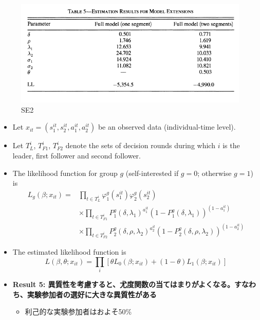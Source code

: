 \documentclass[../root]{subfiles}
\begin{document}
    \begin{figure}
    \centering
    \includegraphics[width = 0.8\linewidth]{1009kato/95461603-61d2d300-09b1-11eb-8ad4-a617d0c1fb57.png}
    \caption{SE2}
    \end{figure}

    \begin{itemize}
    \item
      Let \(x_{it} = (s_1^{it}, s_2^{it}, a_1^{it}, a_2^{it})\) be an observed data (individual-time level).
    \item
      Let \(T^i_L\), \(T^i_{F1}\), \(T^i_{F2}\) denote the sets of decision rounds during which \(i\) is the leader, first follower and second follower.
    \item
      The likelihood function for group \(g\) (self-interested if \(g = 0\); otherwise \(g = 1\)) is
      \begin{equation}
        \begin{split}
          L_g(\beta;x_{it}) =
          &\prod_{t \in T^i_L} \varphi^g_1(s_1^{it}) \varphi^g_2(s_2^{it}) \\
          &\times \prod_{t \in T^i_{F1}} P^g_1(\delta, \lambda_1)^{a_1^{it}} (1 - P^g_1(\delta, \lambda_1))^{(1 - a_1^{it})} \\
          &\times \prod_{t \in T^i_{F2}} P^g_2(\delta, \rho, \lambda_2)^{a_2^{it}} (1 - P^g_2(\delta,\rho, \lambda_2))^{(1 - a_2^{it})}
        \end{split}
      \end{equation}
    \item
      The estimated likelihood function is
      \begin{equation}
      L(\beta, \theta; x_{it}) = \prod_i [\theta L_0(\beta;x_{it}) + (1 - \theta) L_1(\beta; x_{it})]
      \end{equation}
    \item
      \textbf{Result 5: 異質性を考慮すると、尤度関数の当てはまりがよくなる。すなわち、実験参加者の選好に大きな異質性がある}

      \begin{itemize}
      
      \item
        利己的な実験参加者はおよそ50\%
      \end{itemize}
    \end{itemize}
\end{document}

